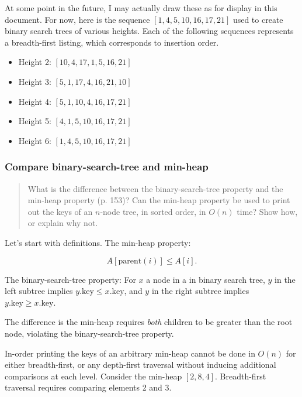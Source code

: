 \documentclass{article}
\begin{document}
At some point in the future, I may actually draw these as for
display in this document. For now, here is the sequence
$[1, 4, 5, 10, 16, 17, 21]$ used to create binary search trees
of various heights. Each of the following sequences represents
a breadth-first listing, which corresponds to insertion order.

\begin{itemize}
  \item Height 2: $[10, 4, 17, 1, 5, 16, 21]$
  \item Height 3: $[5, 1, 17, 4, 16, 21, 10]$
  \item Height 4: $[5, 1, 10, 4, 16, 17, 21]$
  \item Height 5: $[4, 1, 5, 10, 16, 17, 21]$
  \item Height 6: $[1, 4, 5, 10, 16, 17, 21]$
\end{itemize}

\subsubsection{Compare binary-search-tree and min-heap}

\begin{quote}
  What is the difference between the binary-search-tree property and the min-heap
  property (p. 153)? Can the min-heap property be used to print out the keys of
  an $n$-node tree, in sorted order, in $O(n)$ time?  Show how, or explain why
  not.
\end{quote}

Let's start with definitions.
The min-heap property:

\begin{equation}
  A[\mathrm{parent}(i)] \leq A[i].
\end{equation}

The binary-search-tree property: For $x$ a node in a in binary search tree,
$y$ in the left subtree implies $y.\mathrm{key} \leq x.\mathrm{key}$, and
$y$ in the right subtree implies $y.\mathrm{key} \geq x.\mathrm{key}$.

The difference is the min-heap requires \emph{both} children to be
greater than the root node, violating the binary-search-tree property.

In-order printing the keys of an arbitrary min-heap cannot be done in $O(n)$
for either breadth-first, or any depth-first traversal without inducing
additional comparisons at each level. Consider the min-heap $[2, 8, 4]$.
Breadth-first traversal requires comparing elements 2 and 3.
\end{document}
